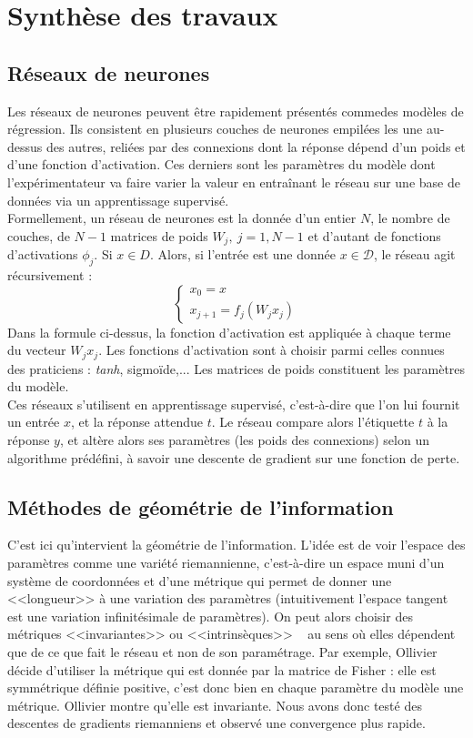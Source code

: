\documentclass{article}
\begin{document}
\section{Synthèse des travaux}

\subsection{Réseaux de neurones}
Les réseaux de neurones peuvent être rapidement présentés commedes modèles de régression. Ils consistent en plusieurs couches de neurones empilées les une au-dessus des autres, reliées par des connexions dont la réponse dépend d'un poids et d'une fonction d'activation. Ces derniers sont les paramètres du modèle dont l'expérimentateur va faire varier la valeur en entraînant le réseau sur une base de données via un apprentissage supervisé. \\

Formellement, un réseau de neurones est la donnée d'un entier $N$, le nombre de couches, de $N-1$ matrices de poids $W_j, \ j=1,N-1$ et d'autant de fonctions d'activations $\phi_j$. Si $x\in D$. Alors, si l'entrée est une donnée $x\in \mathcal D$, le réseau agit récursivement :
\[\left\{\begin{array}{c}x_0=x\\ x_{j+1}=f_j(W_j x_j)\end{array}\right.\]
Dans la formule ci-dessus, la fonction d'activation est appliquée à chaque terme du vecteur $W_j x_j$. Les fonctions d'activation sont à choisir parmi celles connues des praticiens : \textit{tanh}, sigmoïde,... Les matrices de poids constituent les paramètres du modèle.\\

Ces réseaux s'utilisent en apprentissage supervisé, c'est-à-dire que l'on lui fournit un entrée $x$, et la réponse attendue $t$. Le réseau compare alors l'étiquette $t$ à la réponse $y$, et altère alors ses paramètres (les poids des connexions) selon un algorithme prédéfini, à savoir une descente de gradient sur une fonction de perte.\\

\subsection{Méthodes de géométrie de l'information}
C'est ici qu'intervient la géométrie de l'information. L'idée est de voir l'espace des paramètres comme une variété riemannienne, c'est-à-dire un espace muni d'un système de coordonnées et d'une métrique qui permet de donner une <<longueur>> à une variation des paramètres (intuitivement l'espace tangent est une variation infinitésimale de paramètres). On peut alors choisir des métriques <<invariantes>> ou <<intrinsèques>> ~\cite{Ollivier} au sens où elles dépendent que de ce que fait le réseau et non de son paramétrage. Par exemple, Ollivier décide d'utiliser la métrique qui est donnée par la matrice de Fisher : elle est symmétrique définie positive, c'est donc bien en chaque paramètre du modèle une métrique. Ollivier montre qu'elle est invariante. Nous avons donc testé des descentes de gradients riemanniens et observé une convergence plus rapide.\\
\end{document}
